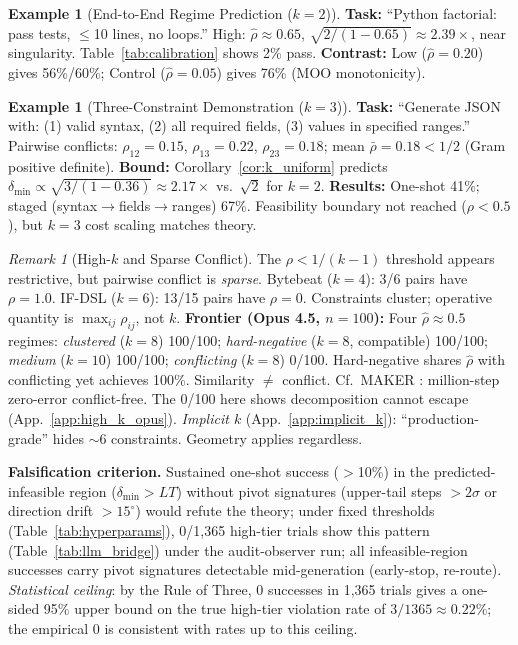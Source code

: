 \documentclass{article}
\theoremstyle{plain}
\theoremstyle{definition}
\newtheorem{example}[theorem]{Example}
\theoremstyle{remark}
\newtheorem{remark}[theorem]{Remark}
\newcommand{\rhohat}{\hat{\rho}}
\newcommand{\appref}[1]{App.~\ref{#1}}
\begin{document}
\begin{example}[End-to-End Regime Prediction ($k{=}2$)]\label{ex:e2e}
\textbf{Task:} ``Python factorial: pass tests, $\leq$10 lines, no loops.'' High: $\rhohat \approx 0.65$, $\sqrt{2/(1{-}0.65)} \approx 2.39\times$, near singularity. Table~\ref{tab:calibration} shows 2\% pass. \textbf{Contrast:} Low ($\rhohat{=}0.20$) gives 56\%/60\%; Control ($\rhohat{=}0.05$) gives 76\% (MOO monotonicity).
\end{example}

\begin{example}[Three-Constraint Demonstration ($k{=}3$)]\label{ex:k3}
\textbf{Task:} ``Generate JSON with: (1) valid syntax, (2) all required fields, (3) values in specified ranges.'' Pairwise conflicts: $\rho_{12}{=}0.15$, $\rho_{13}{=}0.22$, $\rho_{23}{=}0.18$; mean $\bar{\rho}{=}0.18 < 1/2$ (Gram positive definite).
\textbf{Bound:} Corollary~\ref{cor:k_uniform} predicts $\delta_{\min} \propto \sqrt{3/(1{-}0.36)} \approx 2.17\times$ vs.\ $\sqrt{2}$ for $k{=}2$.
\textbf{Results:} One-shot 41\%; staged (syntax$\to$fields$\to$ranges) 67\%. Feasibility boundary not reached ($\rho < 0.5$), but $k{=}3$ cost scaling matches theory.
\end{example}

\begin{remark}[High-$k$ and Sparse Conflict]\label{rem:high_k}
The $\rho < 1/(k{-}1)$ threshold appears restrictive, but pairwise conflict is \emph{sparse}. Bytebeat ($k{=}4$): 3/6 pairs have $\rho{=}1.0$. IF-DSL ($k{=}6$): 13/15 pairs have $\rho{=}0$. Constraints cluster; operative quantity is $\max_{ij}\rho_{ij}$, not $k$. \textbf{Frontier (Opus 4.5, $n{=}100$):} Four $\rhohat{\approx}0.5$ regimes: \emph{clustered} ($k{=}8$) 100/100; \emph{hard-negative} ($k{=}8$, compatible) 100/100; \emph{medium} ($k{=}10$) 100/100; \emph{conflicting} ($k{=}8$) 0/100. Hard-negative shares $\rhohat$ with conflicting yet achieves 100\%. Similarity $\neq$ conflict. Cf.\ MAKER \citep{meyerson2025maker}: million-step zero-error conflict-free. The 0/100 here shows decomposition cannot escape (\appref{app:high_k_opus}). \emph{Implicit $k$} (\appref{app:implicit_k}): ``production-grade'' hides ${\sim}6$ constraints. Geometry applies regardless.
\end{remark}

\noindent\textbf{Falsification criterion.} Sustained one-shot success ($>$10\%) in the predicted-infeasible region ($\delta_{\min} > LT$) without pivot signatures (upper-tail steps $>2\sigma$ or direction drift $>15^\circ$) would refute the theory; under fixed thresholds (Table~\ref{tab:hyperparams}), 0/1{,}365 high-tier trials show this pattern (Table~\ref{tab:llm_bridge}) under the audit-observer run; all infeasible-region successes carry pivot signatures detectable mid-generation (early-stop, re-route). \emph{Statistical ceiling}: by the Rule of Three, 0 successes in 1{,}365 trials gives a one-sided 95\% upper bound on the true high-tier violation rate of $3/1365 \approx 0.22\%$; the empirical 0 is consistent with rates up to this ceiling.
\end{document}
